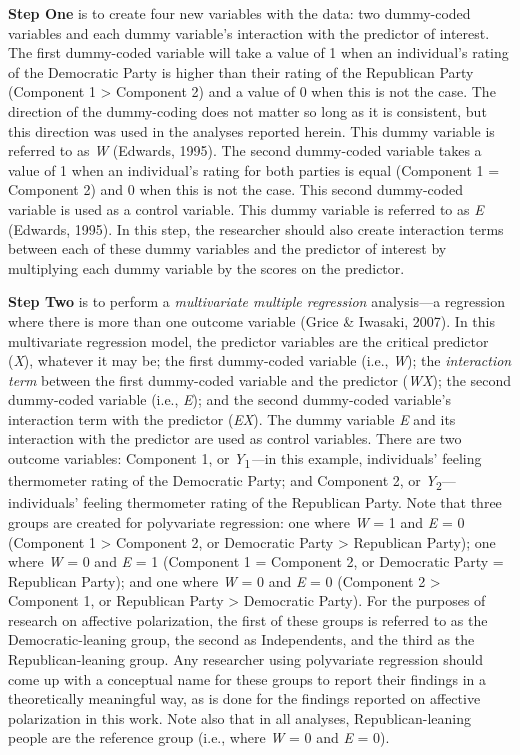 \documentclass[authordate, meta, issue]{jote-new-article}
\begin{document}
	\textbf{Step One} is to create four new variables with the data: two dummy-coded variables and each dummy variable's interaction with the predictor of interest. The first dummy-coded variable will take a value of 1 when an individual's rating of the Democratic Party is higher than their rating of the Republican Party (Component 1 > Component 2) and a value of 0 when this is not the case. The direction of the dummy-coding does not matter so long as it is consistent, but this direction was used in the analyses reported herein. This dummy variable is referred to as \emph{W} (Edwards, 1995). The second dummy-coded variable takes a value of 1 when an individual's rating for both parties is equal (Component 1 = Component 2) and 0 when this is not the case. This second dummy-coded variable is used as a control variable. This dummy variable is referred to as \emph{E} (Edwards, 1995). In this step, the researcher should also create interaction terms between each of these dummy variables and the predictor of interest by multiplying each dummy variable by the scores on the predictor.



	\textbf{Step Two} is to perform a \emph{multivariate multiple regression} analysis—a regression where there is more than one outcome variable (Grice \& Iwasaki, 2007). In this multivariate regression model, the predictor variables are the critical predictor (\emph{X}), whatever it may be; the first dummy-coded variable (i.e., \emph{W}); the \emph{interaction term }between the first dummy-coded variable and the predictor (\emph{WX}); the second dummy-coded variable (i.e., \emph{E}); and the second dummy-coded variable's interaction term with the predictor (\emph{EX}). The dummy variable \emph{E} and its interaction with the predictor are used as control variables. There are two outcome variables: Component 1, or \emph{Y}\textsubscript{1}\emph{—}in this example, individuals' feeling thermometer rating of the Democratic Party; and Component 2, or \emph{Y}\textsubscript{2}—individuals' feeling thermometer rating of the Republican Party. Note that three groups are created for polyvariate regression: one where \emph{W} = 1 and \emph{E} = 0 (Component 1 > Component 2, or Democratic Party > Republican Party); one where \emph{W} = 0 and \emph{E} = 1 (Component 1 = Component 2, or Democratic Party = Republican Party); and one where \emph{W} = 0 and \emph{E} = 0 (Component 2 > Component 1, or Republican Party > Democratic Party). For the purposes of research on affective polarization, the first of these groups is referred to as the Democratic-leaning group, the second as Independents, and the third as the Republican-leaning group. Any researcher using polyvariate regression should come up with a conceptual name for these groups to report their findings in a theoretically meaningful way, as is done for the findings reported on affective polarization in this work. Note also that in all analyses, Republican-leaning people are the reference group (i.e., where \emph{W} = 0 and \emph{E} = 0).
\end{document}
